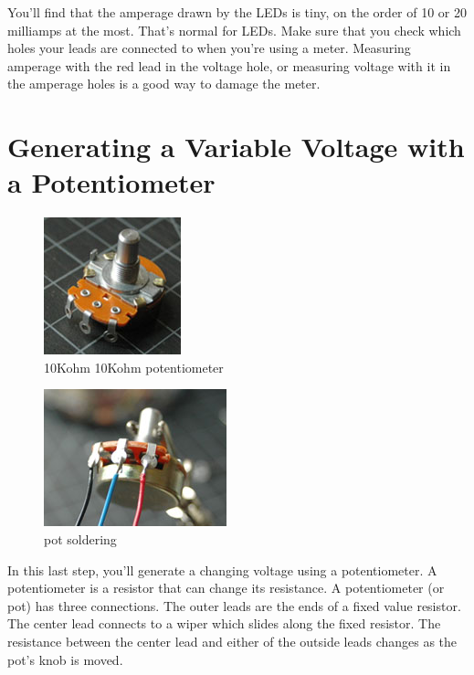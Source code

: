 You'll find that the amperage drawn by the LEDs is tiny, on the order of 10 or 20 milliamps at the most. That's normal for LEDs.
Make sure that you check which holes your leads are connected to when you're using a meter. Measuring amperage with the red lead in the voltage hole, or measuring voltage with it in the amperage holes is a good way to damage the meter.

\section{Generating a Variable Voltage with a Potentiometer}

\begin{figure}[!htb]
 \centering
 \includegraphics[scale=0.8]{img/electronics/potentiometer.jpg}
 \caption{10Kohm 10Kohm potentiometer}
 \label{10Kohm potentiometer}
\end{figure}

\begin{figure}[!htb]
 \centering
 \includegraphics[scale=0.8]{img/electronics/pot_soldering.jpg}
 \caption{pot soldering}
 \label{pot soldering}
\end{figure}

In this last step, you'll generate a changing voltage using a potentiometer. A potentiometer is a resistor that can change its resistance. A potentiometer (or pot) has three connections. The outer leads are the ends of a fixed value resistor. The center lead connects to a wiper which slides along the fixed resistor. The resistance between the center lead and either of the outside leads changes as the pot's knob is moved.

